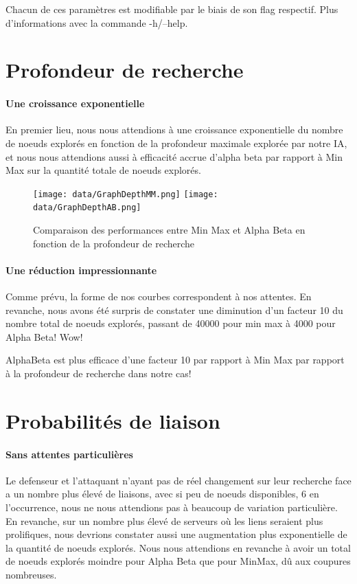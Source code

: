 \documentclass{scrreprt}
\begin{document}
    \begin{info}
        Chacun de ces paramètres est modifiable par le biais de son flag
        respectif. Plus d'informations avec la commande -h/--help.
    \end{info}

    \section{Profondeur de recherche}

    \paragraph{Une croissance exponentielle}
    En premier lieu, nous nous attendions à une croissance exponentielle du
    nombre de noeuds explorés en fonction de la profondeur maximale explorée
    par notre IA, et nous nous attendions aussi à efficacité accrue d'alpha
    beta par rapport à Min Max sur la quantité totale de noeuds explorés.

    \begin{figure}
        \centering
        \texttt{[image: data/GraphDepthMM.png]}
        \texttt{[image: data/GraphDepthAB.png]}
        \caption{Comparaison des performances entre Min Max et Alpha Beta en
        fonction de la profondeur de recherche}
    \end{figure}

    \paragraph{Une réduction impressionnante}
    Comme prévu, la forme de nos courbes correspondent à nos attentes.
    En revanche, nous avons été surpris de constater une diminution d'un
    facteur 10 du nombre total de noeuds explorés, passant de 40000 pour min max
    à 4000 pour Alpha Beta! Wow!

    \begin{result}
        AlphaBeta est plus efficace d'une facteur 10 par rapport à Min Max
        par rapport à la profondeur de recherche dans notre cas!
    \end{result}

    \section{Probabilités de liaison}

    \paragraph{Sans attentes particulières}
    Le defenseur et l'attaquant n'ayant pas de réel changement sur leur
    recherche face a un nombre plus élevé de liaisons, avec si peu de noeuds
    disponibles, 6 en l'occurrence, nous ne nous attendions pas à beaucoup de
    variation
    particulière.
    En revanche, sur un nombre plus élevé de serveurs où les liens seraient
    plus prolifiques, nous devrions constater aussi une augmentation plus
    exponentielle de la quantité de noeuds explorés.
    Nous nous attendions en revanche à avoir un total de noeuds explorés
    moindre pour Alpha Beta que pour MinMax, dû aux coupures nombreuses.
\end{document}
